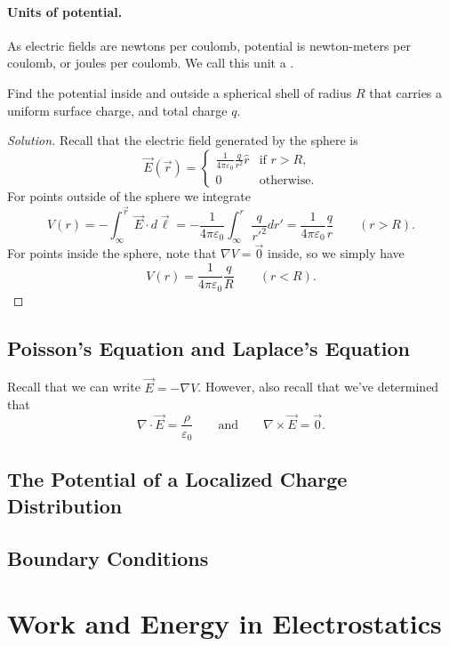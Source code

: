 \paragraph{Units of potential.} As electric fields are newtons per coulomb, potential is newton-meters per coulomb, or joules per coulomb. We call this unit a .

\begin{example}
Find the potential inside and outside a spherical shell of radius $R$ that carries a uniform surface charge, and total charge $q$.
\end{example}

\begin{proof}[Solution]
    Recall that the electric field generated by the sphere is
    \[\vec{E}(\vec{r})=\begin{cases}
        \frac{1}{4\pi \varepsilon_0}\frac{q}{r^2}\hat{r} & \text{if }r>R,\\
        0 & \text{otherwise}.
    \end{cases}\]
    For points outside of the sphere we integrate
    \[V(r)=-\int_\infty^{\vec{r}}\vec{E}\cdot d\vec{\ell}=-\frac{1}{4\pi \varepsilon_0}\int_\infty^r \frac{q}{r'^2}dr'=\frac{1}{4\pi\varepsilon_0}\frac{q}{r} \qquad (r>R).\]
    For points inside the sphere, note that $\nabla V=\vec{0}$ inside, so we simply have 
    \[V(r)=\frac{1}{4\pi\varepsilon_0}\frac{q}{R}\qquad (r<R).\]
\end{proof}

\subsection{Poisson's Equation and Laplace's Equation}

Recall that we can write $\vec{E}=-\nabla V$. However, also recall that we've determined that
\[\nabla\cdot \vec{E}=\frac{\rho}{\varepsilon_0}\qquad \text{and}\qquad\nabla\times\vec{E}=\vec{0}.\]

\subsection{The Potential of a Localized Charge Distribution}

\subsection{Boundary Conditions}

\section{Work and Energy in Electrostatics}

